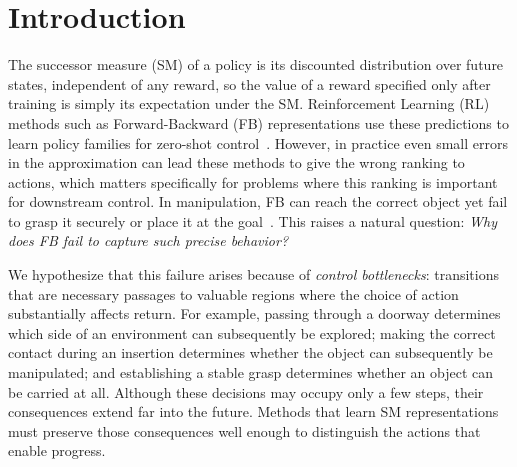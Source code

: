 \section{Introduction}
\label{sec:intro}

The successor measure (SM) of a policy is its discounted distribution over future states, independent of any reward, so the value of a reward specified only after training is simply its expectation under the SM.
Reinforcement Learning  (RL) methods such as Forward-Backward (FB) representations use these predictions to learn policy families for zero-shot control~\citep{touati-neurips21a,touati-iclr23b,agarwal-icml25a}.
However, in practice even small errors in the approximation can lead these methods to give the wrong ranking to actions, which matters specifically for problems where this ranking is important for downstream control.
In manipulation, FB can reach the correct object yet fail to grasp it securely or place it at the goal~\citep{mohan-rlbrew26a}.
This raises a natural question: \emph{Why does FB fail to capture such precise behavior?}

We hypothesize that this failure arises because of \emph{control bottlenecks}: transitions that are necessary passages to valuable regions where the choice of action substantially affects return.
For example, passing through a doorway determines which side of an environment can subsequently be explored; making the correct contact during an insertion determines whether the object can subsequently be manipulated; and establishing a stable grasp determines whether an object can be carried at all.
Although these decisions may occupy only a few steps, their consequences extend far into the future.
Methods that learn SM representations must preserve those consequences well enough to distinguish the actions that enable progress.


